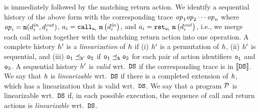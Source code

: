 is immediately followed by the matching return action. 
%
We identify a sequential history of the above form with
the corresponding trace 
${\it op}_1{\it op}_2\cdots{\it op}_n$ where
${\it op}_i={\tt m}(d^{\it in}_i,d^{\it out}_i)$,
$a_i=\mathtt{call}_{\tt o_i}\; {\tt m}\left(d^{\it in}_{i}\right)$, and
$a_i=\mathtt{ret}_{\tt o_i}\; {\tt m}\left(d^{\it out}_{i}\right)$,
i.e., we merge each call action together with the matching return action
into one operation.
%
A complete history $h'$ 
is a {\it linearization} of $h$ if
(i) $h'$ is a permutation of $h$,
(ii) $h'$ is sequential, 
and
(iii) $\tt o_1\preceq_{h'}\tt o_2$
if $\tt o_1\preceq_{h}\tt o_2$
for each pair of action identifiers $\tt o_1$ and $\tt o_2$.
%
A sequential history $h'$ is {\it valid} wrt.\ ${\tt DS}$ if
the corresponding trace is in $\left\llbracket{{\tt DS}}\right\rrbracket$.
%
We say that $h$ is {\it linearizable} wrt.\ ${\tt DS}$ if there is
a completed extension of $h$, which has
a linearization that is valid wrt.\ ${\tt DS}$.
%
We say that a program ${\mathcal P}$ is linearizable wrt.\ 
${\tt DS}$ if, in each possible execution, the sequence
of call and return actions is {\em linearizable} wrt.\ ${\tt DS}$.












